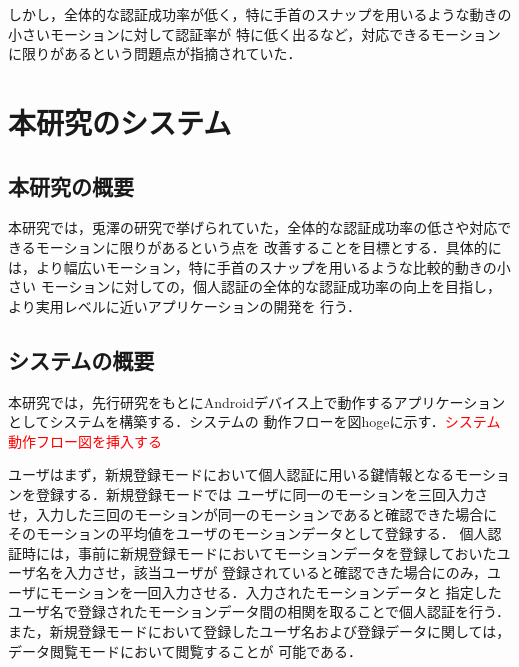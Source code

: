 \documentclass[11pt]{jreport}
\begin{document}
    しかし，全体的な認証成功率が低く，特に手首のスナップを用いるような動きの小さいモーションに対して認証率が
    特に低く出るなど，対応できるモーションに限りがあるという問題点が指摘されていた．

\chapter{本研究のシステム}
	\section{本研究の概要}
	本研究では，兎澤の研究で挙げられていた，全体的な認証成功率の低さや対応できるモーションに限りがあるという点を
    改善することを目標とする．具体的には，より幅広いモーション，特に手首のスナップを用いるような比較的動きの小さい
    モーションに対しての，個人認証の全体的な認証成功率の向上を目指し，より実用レベルに近いアプリケーションの開発を
    行う．
	\section{システムの概要}
	本研究では，先行研究をもとにAndroidデバイス上で動作するアプリケーションとしてシステムを構築する．システムの
    動作フローを図hogeに示す．\textcolor{red}{システム動作フロー図を挿入する}

    ユーザはまず，新規登録モードにおいて個人認証に用いる鍵情報となるモーションを登録する．新規登録モードでは
    ユーザに同一のモーションを三回入力させ，入力した三回のモーションが同一のモーションであると確認できた場合に
    そのモーションの平均値をユーザのモーションデータとして登録する．
    個人認証時には，事前に新規登録モードにおいてモーションデータを登録しておいたユーザ名を入力させ，該当ユーザが
    登録されていると確認できた場合にのみ，ユーザにモーションを一回入力させる．入力されたモーションデータと
    指定したユーザ名で登録されたモーションデータ間の相関を取ることで個人認証を行う．
    また，新規登録モードにおいて登録したユーザ名および登録データに関しては，データ閲覧モードにおいて閲覧することが
    可能である．
\end{document}
